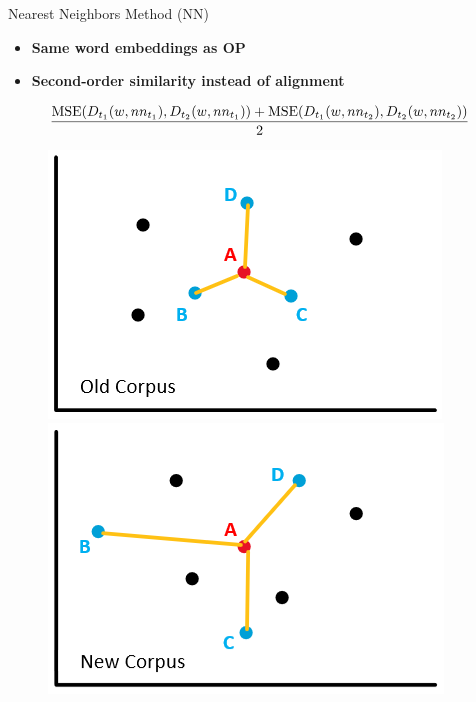 \documentclass[10pt,aspectratio=1610,professionalfont]{beamer}
\begin{document}
\begin{frame}{Nearest Neighbors Method (NN)}
    \begin{itemize}
        \item \textbf{Same word embeddings as OP}
        \item \textbf{Second-order similarity instead of alignment}
    \end{itemize}
    \vspace{10pt}
    \begin{equation}
        \frac{\text{MSE}(D_{t_1}(w, nn_{t_1}), D_{t_2}(w, nn_{t_1})) + \text{MSE}(D_{t_1}(w, nn_{t_2}), D_{t_2}(w, nn_{t_2}))}{2} \notag
    \end{equation}
    \vspace{-25pt}
    \begin{figure}
        \centering
        \subfloat
            {\includegraphics[width=.45\textwidth]{img/nn_1.png}} \quad
        \subfloat
            {\includegraphics[width=.45\textwidth]{img/nn_2.png}}
    \end{figure}
    
\end{frame}
\end{document}
